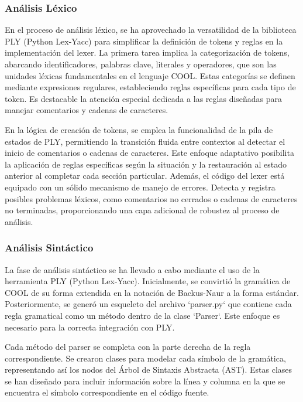 \documentclass[10pt]{article} %
\begin{document}
	\subsubsection{An\'alisis L\'exico}
	
	En el proceso de análisis léxico, se ha aprovechado la versatilidad de la biblioteca PLY (Python Lex-Yacc) para simplificar la definición de tokens y reglas en la implementación del lexer. La primera tarea implica la categorización de tokens, abarcando identificadores, palabras clave, literales y operadores, que son las unidades léxicas fundamentales en el lenguaje COOL. Estas categorías se definen mediante expresiones regulares, estableciendo reglas específicas para cada tipo de token. Es destacable la atención especial dedicada a las reglas diseñadas para manejar comentarios y cadenas de caracteres.
	
	En la lógica de creación de tokens, se emplea la funcionalidad de la pila de estados de PLY, permitiendo la transición fluida entre contextos al detectar el inicio de comentarios o cadenas de caracteres. Este enfoque adaptativo posibilita la aplicación de reglas específicas según la situación y la restauración al estado anterior al completar cada sección particular. Además, el código del lexer está equipado con un sólido mecanismo de manejo de errores. Detecta y registra posibles problemas léxicos, como comentarios no cerrados o cadenas de caracteres no terminadas, proporcionando una capa adicional de robustez al proceso de análisis.
	
	\subsubsection{An\'alisis Sint\'actico}
	
	La fase de análisis sintáctico se ha llevado a cabo mediante el uso de la herramienta PLY (Python Lex-Yacc). Inicialmente, se convirtió la gramática de COOL de su forma extendida en la notación de Backus-Naur a la forma estándar. Posteriormente, se generó un esqueleto del archivo `parser.py` que contiene cada regla gramatical como un método dentro de la clase `Parser`. Este enfoque es necesario para la correcta integración con PLY.
	
	Cada método del parser se completa con la parte derecha de la regla correspondiente. Se crearon clases para modelar cada símbolo de la gramática, representando así los nodos del Árbol de Sintaxis Abstracta (AST). Estas clases se han diseñado para incluir información sobre la línea y columna en la que se encuentra el símbolo correspondiente en el código fuente.
	
\end{document}

